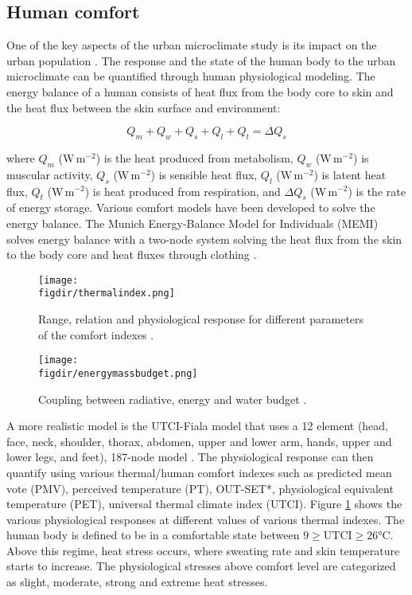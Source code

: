 \subsection{Human comfort}

One of the key aspects of the urban microclimate study is its impact on the urban population \citep{Oke2017a,Saneinejad2013}. The response and the state of the human body to the urban microclimate can be quantified through human physiological modeling. The energy balance of a human consists of heat flux from the body core to skin and the heat flux between the skin surface and environment:

	\begin{equation}
	Q_m + Q_w + Q_s + Q_l + Q_t =  \Delta Q_s
	\end{equation}

where $Q_m$ (W\,m$^{-2}$) is the heat produced from metabolism, $Q_w$ (W\,m$^{-2}$) is muscular activity, $Q_s$ (W\,m$^{-2}$) is sensible heat flux, $Q_l$ (W\,m$^{-2}$) is latent heat flux, $Q_t$ (W\,m$^{-2}$) is heat produced from respiration, and $\Delta Q_s$ (W\,m$^{-2}$) is the rate of energy storage. Various comfort models have been developed to solve the energy balance. The Munich Energy-Balance Model for Individuals (MEMI) solves energy balance with a two-node system solving the heat flux from the skin to the body core and heat fluxes through clothing \citep{Hoppe1999}. 

	\begin{figure}[p]
		\centering
		\texttt{[image: \\figdir/thermalindex.png]}
		\caption{Range, relation and physiological response for different parameters of the comfort indexes \citep{Oke2017a,Matzarakis1999,Bazejczyk2013}.}
		\label{fig:thermalindex}
	\end{figure}
	
	\begin{figure}[p]
	\centering
	\texttt{[image: \\figdir/energymassbudget.png]}
	\caption{Coupling between radiative, energy and water budget \citep{Sawinski2011}.}
	\label{fig:energymassbudget}
	\end{figure}


A more realistic model is the UTCI-Fiala model that uses a 12 element (head, face, neck, shoulder, thorax, abdomen, upper and lower arm, hands, upper and lower legs, and feet), 187-node model \citep{Fiala2001,Brode2012,Blazejczyk2012,Jendritzky2012,Bazejczyk2013,Lokys2015}. The physiological response can then quantify using various thermal/human comfort indexes such as predicted mean vote (PMV), perceived temperature (PT), OUT-SET*, physiological equivalent temperature (PET), universal thermal climate index (UTCI). Figure \ref{fig:thermalindex} shows the various physiological responses at different values of various thermal indexes. The human body is defined to be in a comfortable state between $9\ge \mathrm{UTCI} \ge 26$\si{\celsius}. Above this regime, heat stress occurs, where sweating rate and skin temperature starts to increase. The physiological stresses above comfort level are categorized as slight, moderate, strong and extreme heat stresses.

